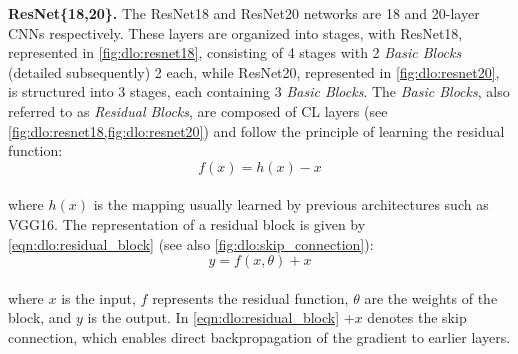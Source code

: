 \noindent \textbf{ResNet\{18,20\}.} The ResNet18 and ResNet20 networks
\cite{DBLP:conf/cvpr/HeZRS16} are 18 and 20-layer \acp{CNN} respectively. These
layers are organized into stages, with ResNet18, represented in
\cref{fig:dlo:resnet18}, consisting of 4 stages with 2 \emph{Basic Blocks}
(detailed subsequently) 2 each, while ResNet20, represented in
\cref{fig:dlo:resnet20}, is structured into 3 stages, each containing 3
\emph{Basic Blocks}. The \emph{Basic Blocks}, also referred to as \emph{Residual
Blocks}, are composed of \ac{CL} layers (see
\cref{fig:dlo:resnet18,fig:dlo:resnet20}) and follow the principle of learning
the residual function:\\

\begin{equation}
  f(x) = h(x) - x
\end{equation} \\

\noindent where $h(x)$ is the mapping usually learned by previous architectures
such as VGG16. The representation of a residual block is given by
\cref{eqn:dlo:residual_block} (see also \cref{fig:dlo:skip_connection}): \\

\begin{equation}
  \label{eqn:dlo:residual_block}
  y = f(x,\theta) + x
\end{equation}\\

\noindent where $x$ is the input, $f$ represents the residual function, $\theta$
are the weights of the block, and $y$ is the output. In
\cref{eqn:dlo:residual_block} $+ x$ denotes the skip connection, which enables
direct backpropagation of the gradient to earlier layers.\\

